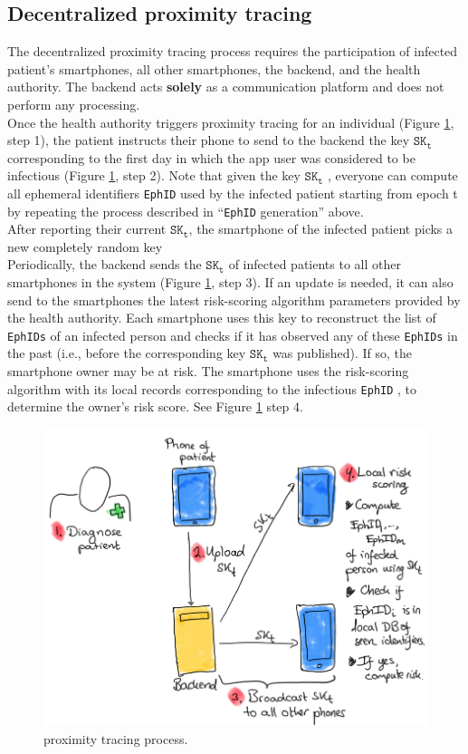 \documentclass[12pt,a4paper]{article}
\begin{document}
\subsection*{Decentralized proximity tracing}
The decentralized proximity tracing process requires the participation of infected patient’s smartphones, all other smartphones, the backend, and the health authority. The backend acts \textbf{solely}  as a communication platform and does not perform any processing.\\[0.3cm]
Once the health authority triggers proximity tracing for an individual (Figure \ref{PT}, step 1), the patient instructs their phone to send to the backend the key $\texttt{SK}_\texttt{t}$ corresponding to the first day in which the app user was considered to be infectious (Figure \ref{PT}, step 2). Note that given the key $\texttt{SK}_\texttt{t}$ , everyone can compute all ephemeral identifiers \texttt{EphID} used by the infected patient starting from epoch t by repeating the process described in “\texttt{EphID} generation” above.\\[0.3cm]
After reporting their current $\texttt{SK}_\texttt{t}$, the smartphone of the infected patient picks a new completely random key\\[0.3cm]
Periodically, the backend sends the $\texttt{SK}_\texttt{t}$ of infected patients to all other smartphones in the system (Figure \ref{PT}, step 3). If an update is needed, it can also send to the smartphones the latest risk-scoring algorithm parameters provided by the health authority. Each smartphone uses this key to reconstruct the list of \texttt{EphIDs} of an infected person and checks if it has observed any of these \texttt{EphIDs} in the past (i.e., before the corresponding key $\texttt{SK}_\texttt{t}$ was published). If so, the smartphone owner may be at risk. The smartphone uses the risk-scoring algorithm with its local records corresponding to the infectious \texttt{EphID} , to determine the owner’s risk score. See Figure \ref{PT} step 4.
\begin{figure}[H]
\centering
\includegraphics[scale=0.65]{fig/PT}
\caption{proximity tracing process.}
\label{PT}
\end{figure}
\end{document}
